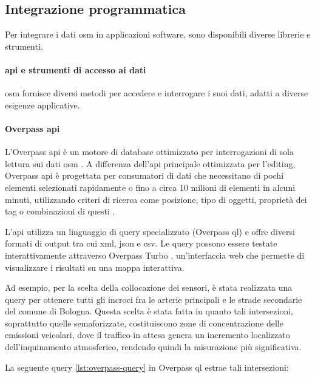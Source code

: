 \subsection{Integrazione programmatica}

Per integrare i dati \acrfull{osm} in applicazioni software, sono disponibili diverse librerie e strumenti.

\paragraph{\acrshort{api} e strumenti di accesso ai dati}

\acrfull{osm} fornisce diversi metodi per accedere e interrogare i suoi dati, adatti a diverse esigenze applicative.

\paragraph{Overpass \acrshort{api}}
L'Overpass \acrshort{api} è un motore di database ottimizzato per interrogazioni di sola lettura sui dati \acrshort{osm}
\cite{overpass2024}. A differenza dell'\acrshort{api} principale ottimizzata per l'editing, Overpass \acrshort{api}
è progettata per consumatori di dati che necessitano di pochi elementi selezionati rapidamente o
fino a circa 10 milioni di elementi in alcuni minuti, utilizzando criteri di ricerca come posizione,
tipo di oggetti, proprietà dei tag o combinazioni di questi \cite{overpass2024}.

L'\acrshort{api} utilizza un linguaggio di query specializzato (Overpass \acrshort{ql}) e
offre diversi formati di output tra cui \acrshort{xml}, \acrshort{json} e \acrshort{csv}.
Le query possono essere testate interattivamente attraverso Overpass Turbo \cite{overpassturbo2024},
un'interfaccia web che permette di visualizzare i risultati su una mappa interattiva.

Ad esempio, per la scelta della collocazione dei sensori, è stata realizzata una query per ottenere tutti gli incroci
fra le arterie principali e le strade secondarie del comune di Bologna. Questa scelta è stata fatta in quanto tali
intersezioni, soprattutto quelle semaforizzate, costituiscono zone di concentrazione delle emissioni veicolari,
dove il traffico in attesa genera un incremento localizzato dell'inquinamento atmosferico,
rendendo quindi la misurazione più significativa.

La seguente query \ref{lst:overpass-query} in Overpass \acrshort{ql} estrae tali intersezioni:


